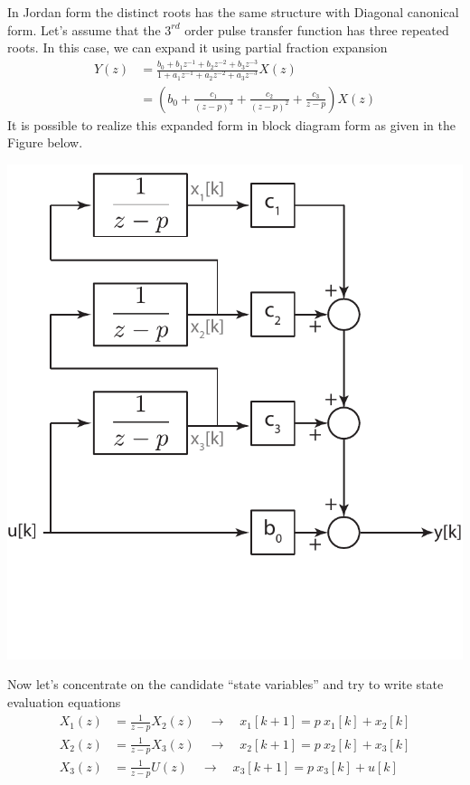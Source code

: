 \documentclass[twoside]{article}
\begin{document}
In Jordan form the distinct roots has the 
same structure with Diagonal canonical
form. Let's assume that the $3^{rd}$
order pulse transfer function has
three repeated roots. In this case,
we can expand it using partial fraction 
expansion 
%
\begin{align*}
Y(z) &= \frac{b_0 + b_1 z^{-1} + b_2 z^{-2} + b_3 z^{-3}}{1+ a_1
       z^{-1} + a_2 z^{-2} + a_3 z^{-3}} X(z)
\\
&= \left( b_0 + \frac{c_1}{(z - p)^3} + \frac{c_2}{(z - p)^2}
+ \frac{c_3}{z - p} \right) X(z)
\end{align*}
%
It is possible to realize this expanded form in block diagram 
form as given in the Figure below.
%
     \begin{center}
 \begin{minipage}[h]{0.5\linewidth}
     \begin{center}
       \includegraphics[width=\textwidth]{jordan}
     \end{center}
 \end{minipage}
     \end{center}
%
Now let's concentrate on the candidate ``state variables''
and try to write state evaluation equations
%
\begin{align*}
X_1(z) &= \frac{1}{z - p} X_2(z) \quad \rightarrow \quad x_1[k+1] = p \
  x_1[k] + x_2[k]
\\
X_2(z) &= \frac{1}{z - p} X_3(z) \quad \rightarrow \quad x_2[k+1] = p
         \ x_2[k] +
  x_3[k]
\\
X_3(z) &= \frac{1}{z - p} U(z) \quad \rightarrow \quad x_3[k+1] = p \
  x_3[k] + u[k]
\end{align*}
\end{document}
